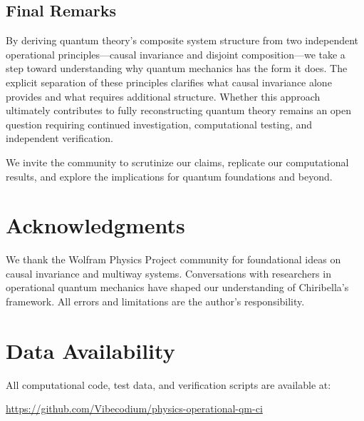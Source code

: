 \documentclass[11pt,a4paper]{article}
\theoremstyle{definition}
\theoremstyle{remark}
\begin{document}
\subsection{Final Remarks}

By deriving quantum theory's composite system structure from two independent operational principles---causal invariance and disjoint composition---we take a step toward understanding why quantum mechanics has the form it does. The explicit separation of these principles clarifies what causal invariance alone provides and what requires additional structure. Whether this approach ultimately contributes to fully reconstructing quantum theory remains an open question requiring continued investigation, computational testing, and independent verification.

We invite the community to scrutinize our claims, replicate our computational results, and explore the implications for quantum foundations and beyond.

\section*{Acknowledgments}

We thank the Wolfram Physics Project community for foundational ideas on causal invariance and multiway systems. Conversations with researchers in operational quantum mechanics have shaped our understanding of Chiribella's framework. All errors and limitations are the author's responsibility.

\section*{Data Availability}

All computational code, test data, and verification scripts are available at:
\begin{center}
\url{https://github.com/Vibecodium/physics-operational-qm-ci}
\end{center}
\end{document}
